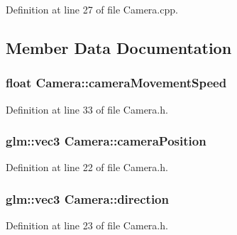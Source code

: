 Definition at line 27 of file Camera.\+cpp.



\subsection{Member Data Documentation}
\hypertarget{class_camera_a0ca21737f5a9fb6a9fda61e7e92c9a5e}{}
\subsubsection[{camera\+Movement\+Speed}]{\setlength{\rightskip}{0pt plus 5cm}float Camera\+::camera\+Movement\+Speed\hspace{0.3cm}{\ttfamily [private]}}\label{class_camera_a0ca21737f5a9fb6a9fda61e7e92c9a5e}


Definition at line 33 of file Camera.\+h.

\hypertarget{class_camera_aca1334c1a10c3a1fe84a2979b205ff9a}{}
\subsubsection[{camera\+Position}]{\setlength{\rightskip}{0pt plus 5cm}glm\+::vec3 Camera\+::camera\+Position\hspace{0.3cm}{\ttfamily [private]}}\label{class_camera_aca1334c1a10c3a1fe84a2979b205ff9a}


Definition at line 22 of file Camera.\+h.

\hypertarget{class_camera_aa91491698db51f70c62199d8c2213514}{}
\subsubsection[{direction}]{\setlength{\rightskip}{0pt plus 5cm}glm\+::vec3 Camera\+::direction\hspace{0.3cm}{\ttfamily [private]}}\label{class_camera_aa91491698db51f70c62199d8c2213514}


Definition at line 23 of file Camera.\+h.

\hypertarget{class_camera_aad9d573147be409e929251eca0bea339}{}
